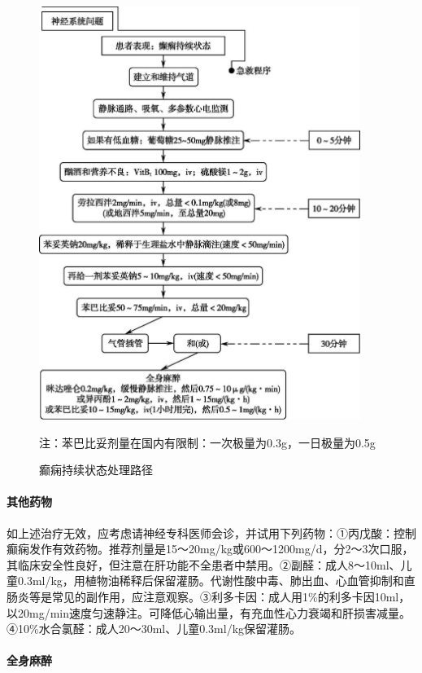 \begin{figure}[!htbp]
 \begin{center}
 \includegraphics[width=4.11458in,height=5.28125in]{./images/Image00038.jpg}
 \captionsetup{justification=centering}
 \caption{癫痫持续状态处理路径}
 \label{fig5-3}
 \end{center}

 {\small
 注：苯巴比妥剂量在国内有限制：一次极量为0.3g，一日极量为0.5g
 }
 \end{figure} 

\paragraph{其他药物}

如上述治疗无效，应考虑请神经专科医师会诊，并试用下列药物：①丙戊酸：控制癫痫发作有效药物。推荐剂量是15～20mg/kg或600～1200mg/d，分2～3次口服，其临床安全性良好，但注意在肝功能不全患者中禁用。②副醛：成人8～10ml、儿童0.3ml/kg，用植物油稀释后保留灌肠。代谢性酸中毒、肺出血、心血管抑制和直肠炎等是常见的副作用，应注意观察。③利多卡因：成人用1\%的利多卡因10ml，以20mg/min速度匀速静注。可降低心输出量，有充血性心力衰竭和肝损害减量。④10\%水合氯醛：成人20～30ml、儿童0.3ml/kg保留灌肠。

\paragraph{全身麻醉}


